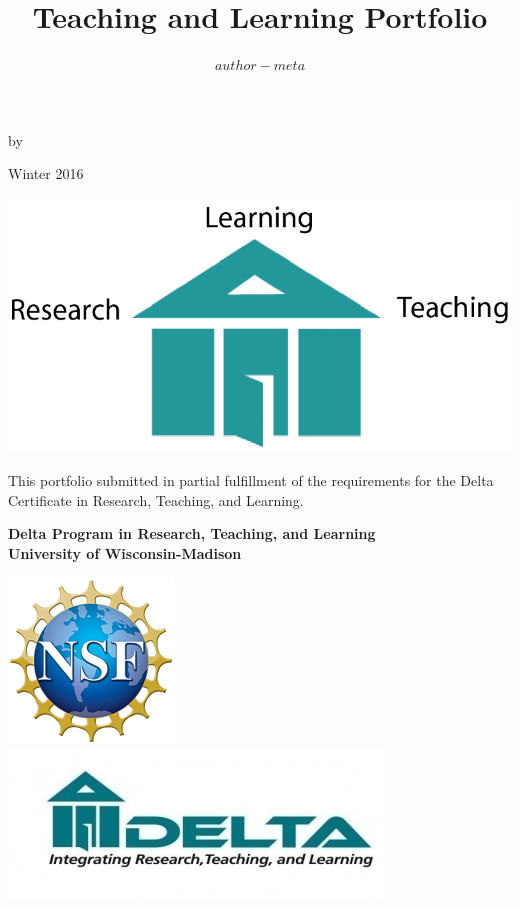 \documentclass[12pt]{report} %
\title{Teaching and Learning Portfolio}
\author{$author-meta$}
\begin{document}
\begin{titlepage}
\begin{center}
\vspace*{0cm}
{\Large \textbf{\@title} \par}
\vspace{0.6cm}
{\Large by \par}
\vspace{0.6cm}
{\Large \textbf{\@author} \par}
\vspace{0.6cm}
{\Large Winter 2016 \par}
\vspace{1.0cm}
\includegraphics[scale=0.5]{images/house.png} \par
\vspace{1.0cm}
{This portfolio submitted in partial fulfillment of the requirements for the Delta Certificate in Research, Teaching, and Learning.\par}
\vspace{0.75cm}
{\textbf{ Delta Program in Research, Teaching, and Learning \\ University of Wisconsin-Madison }\par}
\vspace{0.75cm}
\includegraphics[scale=0.5]{images/nsf.jpg}
\includegraphics[scale=0.5]{images/delta.jpg}\ \ 

\end{center}
\end{titlepage}
\end{document}
